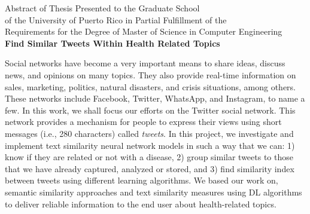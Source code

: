 \documentclass[12pt]{report}
\begin{document}
	\begin{center}
		\doublespacing
		Abstract of Thesis Presented to the Graduate School\\
		of the University of Puerto Rico in Partial Fulfillment of the\\
		Requirements for the Degree of Master of Science in Computer Engineering\\
		\vspace{.1cm}
		\large\textbf {Find Similar Tweets Within Health Related Topics}
	\end{center}
	\doublespacing
Social networks have become a very important means to share ideas, discuss news, and opinions on many topics.  They also provide real-time information on sales, marketing, politics, natural disasters, and crisis situations, among others. These networks include Facebook, Twitter, WhatsApp, and Instagram, to name a few. In this work, we shall focus our efforts on the Twitter social network. This network provides a mechanism for people to express their views using short messages (i.e., 280 characters)
	called {\em tweets}. In this project, we investigate and implement text similarity neural network models in such a way that we can: 1) know if they are related or not with a disease, 2) group similar tweets to those that we have already captured, analyzed or stored, and 3) find similarity index between tweets using different learning algorithms. We based our work on, semantic similarity approaches and text similarity measures using \ac{DL} algorithms to deliver reliable information to the end user about health-related topics.

	\par
	\clearpage
	
\end{document}
